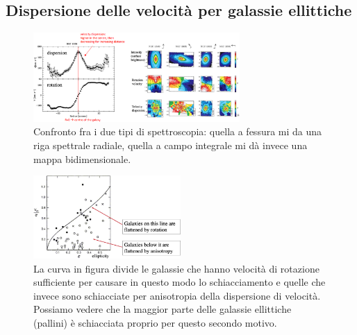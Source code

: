 \subsection{Dispersione delle velocità per galassie ellittiche}

\begin{figure}
    \centering
    \includegraphics[width =0.7\textwidth]{immagini/spettroscopia-fessura-campo-integrale.png}
    \caption{Confronto fra i due tipi di spettroscopia: quella a fessura mi da una riga spettrale radiale, quella a campo integrale mi dà invece una mappa bidimensionale.}
    \label{fig:spettroscopia-fessura-campo-integrale}
\end{figure}

\begin{figure}
    \centering
    \includegraphics[width = 0.5\textwidth]{immagini/schiacciamento-galassie.png}
    \caption{La curva in figura divide le galassie che hanno velocità di rotazione sufficiente per causare in questo modo lo schiacciamento e quelle che invece sono schiacciate per anisotropia della dispersione di velocità. Possiamo vedere che la maggior parte delle galassie ellittiche (pallini) è schiacciata proprio per questo secondo motivo.}
    \label{fig:schiacciamento-galassie}
\end{figure}

